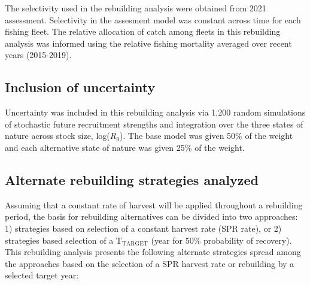 \documentclass[11pt,
  english,
  a4paper,
]{article}
\begin{document}
The selectivity used in the rebuilding analysis were obtained from 2021 assessment. Selectivity in the assesment model was constant across time for each fishing fleet. The relative allocation of catch among fleets in this rebuilding analysis was informed using the relative fishing mortality averaged over recent years (2015-2019).

\leavevmode\tagmcend\tagstructend\par


\hypertarget{inclusion-of-uncertainty}{%
\subsection{Inclusion of uncertainty}\label{inclusion-of-uncertainty}}

\leavevmode\tagmcend\tagstructend


Uncertainty was included in this rebuilding analysis via 1,200 random simulations of stochastic future recruitment strengths and integration over the three states of nature across stock size, log({\(R_0\)\leavevmode\tagmcend\tagstructend}). The base model was given 50\% of the weight and each alternative state of nature was given 25\% of the weight.

\leavevmode\tagmcend\tagstructend\par


\hypertarget{alternate-rebuilding-strategies-analyzed}{%
\subsection{Alternate rebuilding strategies analyzed}\label{alternate-rebuilding-strategies-analyzed}}

\leavevmode\tagmcend\tagstructend


Assuming that a constant rate of harvest will be applied throughout a rebuilding period, the basis for rebuilding alternatives can be divided into two approaches: 1) strategies based on selection of a constant harvest rate (SPR rate), or 2) strategies based selection of a {\(\text{T}_\text{TARGET}\)\leavevmode\tagmcend\tagstructend} (year for 50\% probability of recovery). This rebuilding analysis presents the following alternate strategies spread among the approaches based on the selection of a SPR harvest rate or rebuilding by a selected target year:
\end{document}
